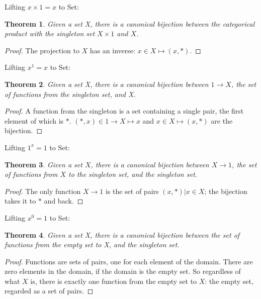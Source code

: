 \documentclass{proc-l}
\newtheorem{theorem}{Theorem}[section]
\theoremstyle{definition}
\theoremstyle{remark}
\numberwithin{equation}{section}
\begin{document}

Lifting \(x \times 1 = x\) to Set:

\begin{theorem}
Given a set X, there is a canonical bijection between the categorical product with the singleton set \(X \times 1\) and \(X\).
\end{theorem}

\begin{proof}
The projection to \(X\) has an inverse: \(x \in X \mapsto (x, *)\). 
\end{proof}

Lifting \(x^1 = x\) to Set:

\begin{theorem}
Given a set X, there is a canonical bijection between \(1 \to X\), the set of functions from the singleton set, and X.
\end{theorem}

\begin{proof}
A function from the singleton is a set containing a single pair, the first element of which is \(*\). \({(*, x)} \in 1 \to X \mapsto x\) and \(x \in X \mapsto {(x, *)}\) are the bijection.
\end{proof}

Lifting \(1^x = 1\) to Set:

\begin{theorem}
Given a set \(X\), there is a canonical bijection between \(X \to 1\), the set of functions from \(X\) to the singleton set, and the singleton set.
\end{theorem}

\begin{proof}
The only function \(X \to 1\) is the set of pairs \({ (x, *) | x \in X }\); the bijection takes it to \(*\) and back.
\end{proof}

Lifting \(x^0 = 1\) to Set:

\begin{theorem}
Given a set X, there is a canonical bijection between the set of functions from the empty set to X, and the singleton set.
\end{theorem}

\begin{proof}
Functions are sets of pairs, one for each element of the domain. There are zero elements in the domain, if the domain is the empty set. So regardless of what \(X\) is, there is exactly one function from the empty set to \(X\): the empty set, regarded as a set of pairs.
\end{proof}
\end{document}
